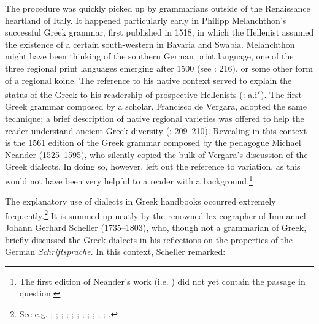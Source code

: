 The procedure was quickly picked up by grammarians outside of the Renaissance heartland of Italy. It happened particularly early in Philipp Melanchthon’s successful Greek grammar, first published in 1518, in which the  Hellenist assumed the existence of a certain south-western   in Bavaria and Swabia. Melanchthon might have been thinking of the southern German print language, one of the three regional print languages emerging after 1500 (see \citealt{Mattheier2003}: 216), or some other form of a regional koine. The reference to his native  context served to explain the status of the Greek  to his readership of prospective Hellenists (\citealt{Melanchthon1518}: a.i\textsc{\textsuperscript{v}}). The first Greek grammar composed by a  scholar, Francisco de Vergara, adopted the same technique; a brief description of native regional varieties was offered to help the  reader understand ancient Greek diversity (\citealt{Vergara1537}: 209–210). Revealing in this context is the 1561 edition of the Greek grammar composed by the  pedagogue Michael Neander (1525–1595), who silently copied the bulk of Vergara’s discussion of the Greek dialects. In doing so, however, \citet[340--343]{Neander1561} left out the reference to  variation, as this would not have been very helpful to a reader with a  background.\footnote{The first edition of Neander’s work (i.e. \citealt{Neander1553}) did not yet contain the passage in question.}

The explanatory use of  dialects in Greek handbooks occurred extremely frequently.\footnote{See e.g. \citet[3--4]{Schmidt1604}; \citet[83]{Rhenius1626}; \citet[\textsc{b.4}\textsc{\textsuperscript{r}}]{Schorling1678}; \citet[\textsc{b.2}\textsc{\textsuperscript{v}}]{KirchmaierCrusius1684}; \citet[376]{Kober1701}; \citet[\textsc{c.2}\textsc{\textsuperscript{v}}]{Thryllitsch1709}; \citet[b.2\textsc{\textsuperscript{v}}\textsc{–}b.3\textsc{\textsuperscript{r}}]{Nibbe1725}; \citet[141]{Georgi1733}; \citet[13]{Schuster1737}; \citet[207--209]{Simonis1752}; \citet[191--192]{Peternader1776}; \citet[\textsc{xxvi}]{Harles1778}.} It is summed up neatly by the renowned  lexicographer of  Immanuel Johann Gerhard Scheller (1735–1803), who, though not a grammarian of Greek, briefly discussed the Greek dialects in his reflections on the properties of the German \textit{Schriftsprache}. In this context, Scheller remarked:

